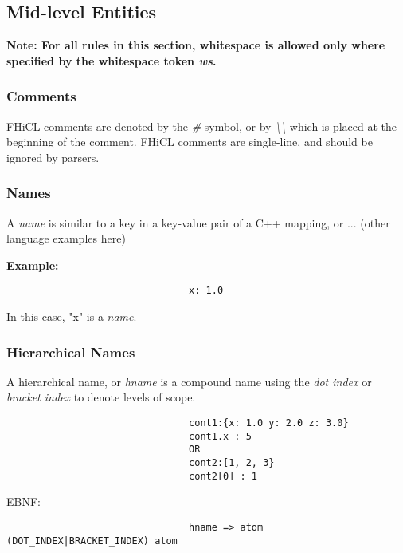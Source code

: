 \documentclass{article}
\begin{document}
        \subsection{Mid-level Entities}
                \bf Note: \rm For all rules in this section,
                whitespace is allowed only where specified by the whitespace token \emph{ws}.
                \subsubsection{Comments}
                        FHiCL comments are denoted by the \emph{\#} symbol,
                        or by \emph{\textbackslash\textbackslash}
                        which is placed at the beginning of the comment.
                        FHiCL comments are single-line,
                        and should be ignored by parsers.
                \subsubsection{Names}
                        A \emph{name} is similar to a key in a key-value pair of a C++ mapping, or ... (other language examples here)
                        \vspace{1mm}
                        \par\bf{Example:}
                        \rm
                        \begin{verbatim}
                                x: 1.0
                        \end{verbatim}
                        \vspace{1mm}
                        In this case, 
                        "x" is a \emph{name}.
                \subsubsection{Hierarchical Names}
                        A hierarchical name,
                        or \emph{hname} is a compound name 
                        using the \emph{dot index}
                        or \emph{bracket index}
                        to denote levels of scope.
                        \begin{verbatim}
                                cont1:{x: 1.0 y: 2.0 z: 3.0}
                                cont1.x : 5
                                OR
                                cont2:[1, 2, 3}
                                cont2[0] : 1
                        \end{verbatim}
                        \vspace{1mm}
                        \par
                        EBNF:
                        \begin{verbatim}
                                hname => atom (DOT_INDEX|BRACKET_INDEX) atom
                        \end{verbatim}
        
\end{document}
